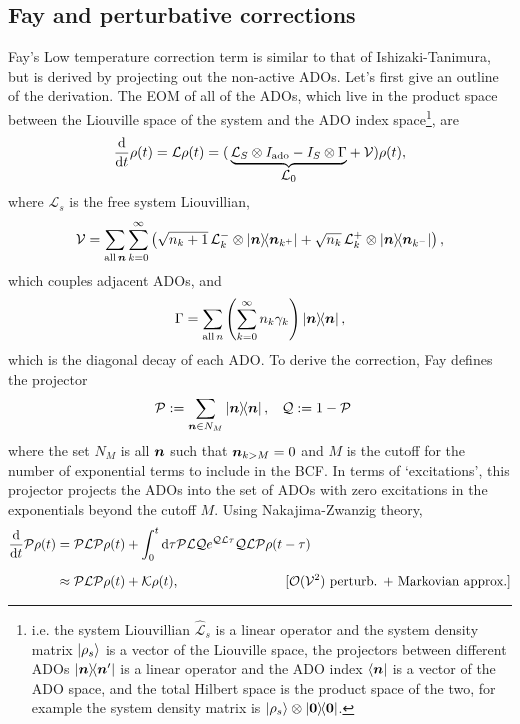 \documentclass{article}
\begin{document}
\subsection{Fay and perturbative corrections}
Fay's Low temperature correction term is similar to that of Ishizaki-Tanimura, but is derived by projecting out the non-active ADOs. Let's first give an outline of the derivation. The EOM of all of the ADOs, which live in the product space between the Liouville space of the system and the ADO index space\footnote{i.e. the system Liouvillian $\hat{\mathcal{L}}_s$ is a linear operator and the system density matrix $\ket{\rho_s}$ is a vector of the Liouville space, the projectors between different ADOs $\ketbra{\boldsymbol{n}}{\boldsymbol{n}'}$ is a linear operator and the ADO index $\bra{\boldsymbol{n}}$ is a vector of the ADO space, and the total Hilbert space is the product space of the two, for example the system density matrix is $\ket{\rho_s}\otimes\ketbra{\boldsymbol{0}}$. }, are 
\begin{align}
    \frac{\d}{\d t}  \rho(t) = \mathcal{L}\rho(t)  = (\,{\underbrace{\mathcal{L}_S \otimes I_{\text{ado}} - I_S \otimes \Gamma}_{\mathlarger{\mathcal{L}_0}}} + \mathcal{V} ) \rho(t), 
\end{align}
where  $\mathcal{L}_s$ is the free system Liouvillian,
\begin{align}
\mathcal{V} = \sum_{\text{all\,}\boldsymbol{n}}\sum_{k=0}^{\infty} \left( 
\sqrt{n_k + 1} \, \mathcal{L}_k^{-} \otimes \ketbra{\boldsymbol{n}}{\boldsymbol{n}_{k^+}} + 
\sqrt{n_k} \, \mathcal{L}_k^{+} \otimes \ketbra{\boldsymbol{n}}{\boldsymbol{n}_{k^-}}
\right),
\end{align}
which couples adjacent ADOs,
and 
\begin{align}
    \Gamma = \sum_{\text{all} \,n}\left(\sum_{k=0}^{\infty}n_k\gamma_k\right)\ketbra{\boldsymbol{n}}{\boldsymbol{n}},
\end{align}
which is the diagonal decay of each ADO. To derive the correction, Fay defines the projector
\begin{align}
    \mathcal{P} &:= \sum_{\boldsymbol{n}\in N_M}\ketbra{\boldsymbol{n}}{\boldsymbol{n}}, & \mathcal{Q}&:=1-\mathcal{P}
\end{align}
where the set $N_M$ is all $\boldsymbol{n}$ such that $\boldsymbol{n}_{k>M}=0$ and $M$ is the cutoff for the number of exponential terms to include in the BCF. In terms of `excitations', this projector projects the ADOs into the set of ADOs with zero excitations in the exponentials beyond the cutoff $M$. Using Nakajima-Zwanzig theory,
\begin{align}
    \frac{{\rm d}}{{\rm d} t}\mathcal{P}\rho(t) &= \mathcal{PLP}\rho(t)
+\int_0^t{\rm d}\tau\mathcal{PLQ}e^{\mathcal{QL}\tau}\mathcal{QLP}\rho(t-\tau)\nonumber \\[6pt]
&\approx \mathcal{PLP}\rho(t)
+\mathcal{K}\rho(t),\qquad\qquad\qquad\qquad[\mathcal{O}(\mathcal{V}^2)\text{ perturb. + Markovian approx.}] 
\end{align}
\end{document}
